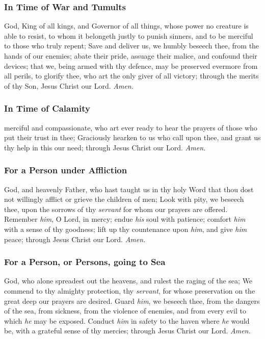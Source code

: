 \subsubsection{In Time of War and Tumults}
 God, King of all kings, and Governor of all things, whose power no creature is able to resist, to whom it belongeth justly to punish sinners, and to be merciful to those who truly repent; Save and deliver us, we humbly beseech thee, from the hands of our enemies; abate their pride, assuage their malice, and confound their devices; that we, being armed with thy defence, may be preserved evermore from all perils, to glorify thee, who art the only giver of all victory; through the merits of thy Son, Jesus Christ our Lord. \textit{Amen.}

\subsubsection{In Time of Calamity}
 merciful and compassionate, who art ever ready to hear the prayers of those who put their trust in thee; Graciously hearken to us who call upon thee, and grant us thy help in this our need; through Jesus Christ our Lord. \textit{Amen.}

\subsubsection{For a Person under Affliction}

 God, and heavenly Father, who hast taught us in thy holy Word that thou dost not willingly afflict or grieve the children of men; Look with pity, we beseech thee, upon the sorrows of thy \textit{servant} for whom our prayers are offered. Remember \textit{him}, O Lord, in mercy; endue \textit{his} soul with patience; comfort \textit{him} with a sense of thy goodness; lift up thy countenance upon \textit{him}, and give \textit{him} peace; through Jesus Christ our Lord. \textit{Amen.}

\clearpage
\subsubsection{For a Person, or Persons, going to Sea}

 God, who alone spreadest out the heavens, and rulest the raging of the sea; We commend to thy almighty protection, thy \textit{servant}, for whose preservation on the great deep our prayers are desired. Guard \textit{him}, we beseech thee, from the dangers of the sea, from sickness, from the violence of enemies, and from every evil to which \textit{he} may be exposed. Conduct \textit{him} in safety to the haven where \textit{he} would be, with a grateful sense of thy mercies; through Jesus Christ our Lord. \textit{Amen.}

